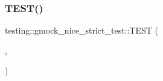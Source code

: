 \subsubsection{\texorpdfstring{T\+E\+S\+T()}{TEST()}\hspace{0.1cm}{\footnotesize\ttfamily [17/17]}}
{\footnotesize\ttfamily testing\+::gmock\+\_\+nice\+\_\+strict\+\_\+test\+::\+T\+E\+ST (\begin{DoxyParamCaption}\item[{Strict\+Mock\+Test}]{,  }\item[{Accepts\+Class\+Named\+Mock}]{ }\end{DoxyParamCaption})}

